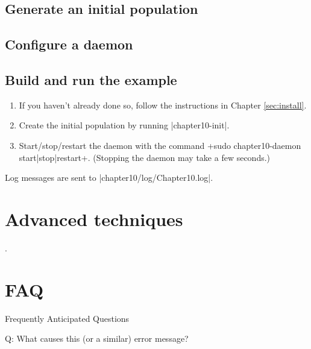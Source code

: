 \documentclass[a4paper,10pt]{report}
\begin{document}





\section{Generate an initial population}
\label{sec:pop5}



\section{Configure a daemon}
\label{sec:daemon5}



\section{Build and run the example}
\label{sec:run5}

\begin{enumerate}
\item If you haven't already done so, follow the instructions in Chapter 
\ref{sec:install}.
\item Create the initial population by running |chapter10-init|.
\item Start/stop/restart the daemon with the command
\UndefineShortVerb{\|}
\DefineShortVerb{\+}
+sudo chapter10-daemon start|stop|restart+.
\UndefineShortVerb{\+}
\DefineShortVerb{\|}
(Stopping the daemon may take a few seconds.)
\end{enumerate}

Log messages are sent to |chapter10/log/Chapter10.log|.

\chapter{Advanced techniques}
\label{sec:advanced}.



\chapter{FAQ}

Frequently Anticipated Questions

Q: What causes this (or a similar) error message?
\end{document}
